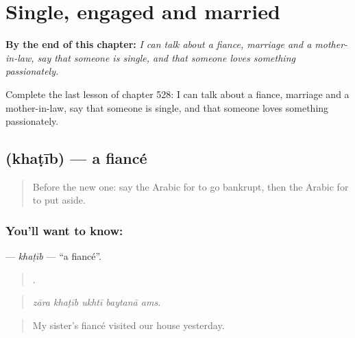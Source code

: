 
\chapter{Single, engaged and married}
\label{ch:ar-single-engaged-and-married}

\begin{chapteropening}
\textbf{By the end of this chapter:} \emph{I can talk about a fiance, marriage and a mother-in-law, say that someone is single, and that someone loves something passionately.}

Complete the last lesson of chapter 528: I can talk about a fiance, marriage and a mother-in-law, say that someone is single, and that someone loves something passionately.
\end{chapteropening}

\section[\texorpdfstring{\ar{خطيب} (khaṭīb)}{خطيب (khaṭīb)}]{ (khaṭīb) — a fiancé}

\label{lesson:AR-C528-khatib}



\begin{quote}
Before the new one: say the Arabic for to go bankrupt, then the Arabic for to put aside.
\end{quote}

\subsection*{You'll want to know: }
\textbf{} — \emph{khaṭīb} — \textquotedblleft{}a fiancé\textquotedblright{}.

\begin{quote}
    .
\end{quote}

\begin{quote}
\emph{zāra khaṭīb ukhtī baytanā ams.}
\end{quote}

\begin{quote}
My sister's fiancé visited our house yesterday.
\end{quote}

